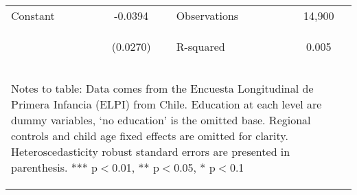 \begin{table}[htpb!]
\begin{center}
\begin{tabular}{lclc}
Constant	&	-0.0394	&	Observations	&	14,900 \\
	\vspace{4pt} & \begin{footnotesize}	(0.0270)	\end{footnotesize} & \begin{footnotesize}	R-squared	\end{footnotesize} & \begin{footnotesize}	0.005	\end{footnotesize}\\ \midrule
\multicolumn{4}{p{11cm}}{\begin{footnotesize}Notes to table: Data comes from the Encuesta Longitudinal de Primera Infancia (ELPI) from Chile.  Education at each level are dummy variables, ‘no education’ is the omitted base. Regional controls and child age fixed effects are omitted for clarity.  Heteroscedasticity robust standard errors are presented in parenthesis. *** p$<$0.01, ** p$<$0.05, * p$<$0.1\end{footnotesize}} \\ \bottomrule
\end{tabular}\end{center}\end{table}							

